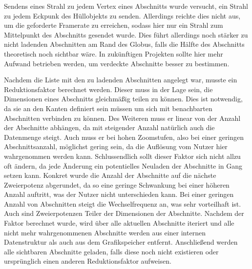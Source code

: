 Sendens eines Strahl zu jedem Vertex eines Abschnitts wurde versucht, ein Strahl zu jedem Eckpunk des Hüllobjekts zu senden. Allerdings reichte dies nicht aus, um die geforderte Framerate zu erreichen, sodass hier nur ein Strahl zum Mittelpunkt des Abschnitts gesendet wurde. Dies führt allerdings noch stärker zu nicht ladenden Abschnitten am Rand des Globus, falls die Hälfte des Abschnitts theoretisch noch sichtbar wäre. In zukünftigen Projekten sollte hier mehr Aufwand betrieben werden, um verdeckte Abschnitte besser zu bestimmen.

Nachdem die Liste mit den zu ladenden Abschnitten angelegt war, musste ein Reduktionsfaktor berechnet werden. Dieser muss in der Lage sein, die Dimensionen eines Abschnitts gleichmäßig teilen zu können. Dies ist notwendig, da sie an den Kanten definiert sein müssen um sich mit benachbarten Abschnitten verbinden zu können. Des Weiteren muss er linear von der Anzahl der Abschnitte abhängen, da mit steigender Anzahl natürlich auch die Datenmenge steigt. Auch muss er bei hohen Zoomstufen, also bei einer geringen Abschnittsanzahl, möglichst gering sein, da die Auflösung vom Nutzer hier wahrgenommen werden kann. Schlussendlich sollt dieser Faktor sich nicht allzu oft ändern, da jede Änderung ein potentielles Neuladen der Abschnitte in Gang setzen kann. Konkret wurde die Anzahl der Abschnitte auf die nächste Zweierpotenz abgerundet, da so eine geringe Schwankung bei einer höheren Anzahl auftritt, was der Nutzer nicht unterschieden kann. Bei einer geringen Anzahl von Abschnitten steigt die Wechselfrequenz an, was sehr vorteilhaft ist. Auch sind Zweierpotenzen Teiler der Dimensionen der Abschnitte. Nachdem der Faktor berechnet wurde, wird über alle aktuellen Abschnitte iteriert und alle nicht mehr wahrgenommenen Abschnitte werden aus einer internen Datenstruktur als auch aus dem Grafikspeicher entfernt. Anschließend werden alle sichtbaren Abschnitte geladen, falls diese noch nicht existieren oder ursprünglich einen anderen Reduktionsfaktor aufweisen.

